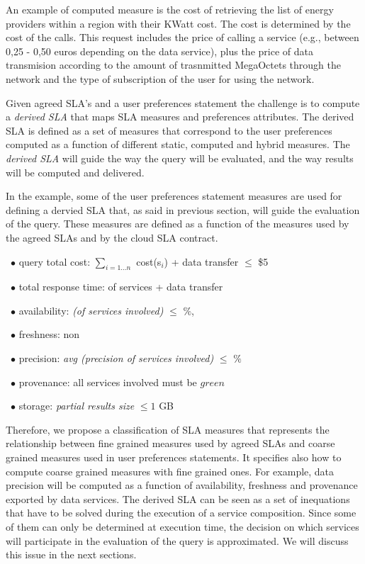 An example of computed measure is the cost of retrieving the list of energy providers within a region with their KWatt cost. The cost is determined by the  cost of the calls. This request  includes the price of calling a service (e.g.,  between 0,25 - 0,50 euros depending on the data service), plus the price of data transmision according to the amount of trasnmitted MegaOctets through the network and the type of subscription of the user for using the network. 


Given agreed SLA's and a user preferences statement the challenge is to compute a  {\em derived SLA} that  maps SLA measures and preferences attributes.  The derived SLA is defined as a set of measures that correspond to the user preferences computed as a function of different static, computed and hybrid measures. The {\em derived SLA}  will guide the way the query will be evaluated, and the way results will be computed and delivered.

In the example, some of the user preferences statement measures are used for defining a dervied SLA that, as said in previous section, will guide the evaluation of the query. These measures are defined as a function of the measures used by the agreed SLAs and by the cloud SLA contract.
\begin{trivlist}\sf\footnotesize
\item[~$\bullet$ ] query total cost: $\sum_{i = 1\dots n}$ cost(s$_i$) + data transfer $\leq$ \$5
 \item[~$\bullet$ ] total response time: of services + data transfer
 \item[~$\bullet$ ] availability: {\em (of services involved)} $\leq$ {$\%$}, 
 \item[~$\bullet$ ] freshness: non 
 \item[~$\bullet$ ] precision: {\em avg (precision of services involved)} $\leq$ {$\%$}
 \item[~$\bullet$ ] provenance:  all services involved must be $green$
 \item[~$\bullet$ ] storage: {\em partial results size} $\leq 1$ GB
 \end{trivlist} 
 
Therefore, we propose a classification of SLA measures that represents the relationship between fine grained measures used by agreed SLAs and coarse grained measures used in user preferences statements. It specifies also how to compute coarse grained measures with fine grained ones. For example, data precision will be computed as a function of availability, freshness and provenance exported by data services. The derived SLA  can be seen as a set of inequations that have to be solved during the execution of a service composition. Since some of them can only be determined at execution time, the decision on which services will participate in the evaluation of the query is approximated. We will discuss this issue in the next sections.


